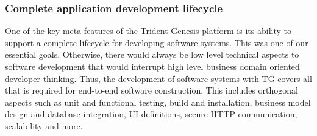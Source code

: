 \documentclass[a4paper,10pt,twocolumn,oneside,openright,final]{memoir}
\begin{document}
\subsubsection*{Complete application development lifecycle}
	One of the key meta-features of the Trident Genesis platform is its ability to support a complete lifecycle for developing software systems.
	This was one of our essential goals.
	Otherwise, there would always be low level technical aspects to software development that would interrupt high level business domain oriented developer thinking.
	Thus, the development of software systems with TG covers all that is required for end-to-end software construction.
	This includes orthogonal aspects such as unit and functional testing, build and installation, business model design and database integration, UI definitions, secure HTTP communication, scalability and more.
\end{document}
